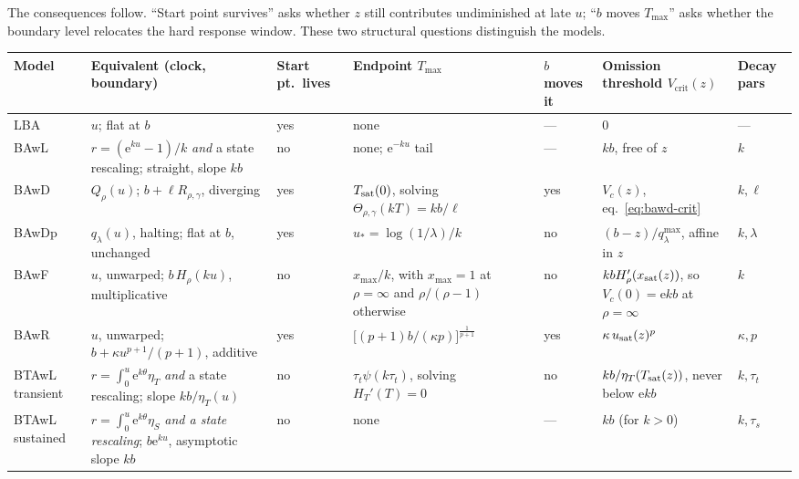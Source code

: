 \documentclass[12pt]{article}
\newcommand{\e}{\mathrm{e}}
\theoremstyle{remark}
\begin{document}
The consequences follow. ``Start point survives'' asks whether $z$ still contributes undiminished at late $u$; ``$b$ moves $T_{\max}$'' asks whether the boundary level relocates the hard response window. These two structural questions distinguish the models.

\begin{center}
\small
\begin{tabular}{L{0.07\textwidth}L{0.175\textwidth}L{0.05\textwidth}L{0.195\textwidth}L{0.05\textwidth}L{0.135\textwidth}L{0.05\textwidth}}
\toprule
Model & Equivalent (clock, boundary) & Start pt.\ lives & Endpoint
$T_{\max}$ & $b$ moves it & Omission threshold
$V_{\mathrm{crit}}(z)$ & Decay pars \\
\midrule
LBA & $u$; flat at $b$ & yes & none & --- & $0$ & --- \\
\addlinespace
BAwL & $r=(\e^{ku}-1)/k$ \emph{and} a state rescaling; straight, slope $kb$ &
no & none; $\e^{-ku}$ tail & --- & $kb$, free of $z$ & $k$ \\
\addlinespace
BAwD & $Q_\rho(u)$; $b+\ell R_{\rho,\gamma}$, diverging &
yes & $T_{\rm sat}(0)$, solving
$\Theta_{\rho,\gamma}(kT)=kb/\ell$ &
yes & $V_c(z)$, eq.~\eqref{eq:bawd-crit} & $k,\ell$ \\
\addlinespace
BAwDp & $q_\lambda(u)$, halting; flat at $b$, unchanged &
yes & $u_{*}=\log(1/\lambda)/k$ & no & $(b-z)/q_\lambda^{\max}$, affine in $z$
& $k,\lambda$ \\
\addlinespace
BAwF & $u$, unwarped; $b\,H_\rho(ku)$, multiplicative &
no & $x_{\max}/k$, with $x_{\max}=1$ at $\rho=\infty$ and
$\rho/(\rho-1)$ otherwise &
no & $kbH_\rho'(x_{\rm sat}(z))$, so $V_c(0)=\e kb$ at $\rho=\infty$ & $k$ \\
\addlinespace
BAwR & $u$, unwarped; $b+\kappa u^{p+1}/(p+1)$, additive &
yes & $\bigl[(p+1)b/(\kappa p)\bigr]^{\frac{1}{p+1}}$ & yes &
$\kappa\,u_{\rm sat}(z)^{p}$ & $\kappa,p$ \\
\addlinespace
BTAwL transient & $r=\int_0^u\e^{k\theta}\eta_T$ \emph{and} a state rescaling;
slope $kb/\eta_T(u)$ &
no & $\tau_t\psi(k\tau_t)$, solving $H_T'(T)=0$ &
no & $kb/\eta_T(T_{\rm sat}(z))$, never below $\e kb$ & $k,\tau_t$ \\
BTAwL sustained & $r=\int_0^u\e^{k\theta}\eta_S$ \emph{and a state rescaling};
$b\e^{ku}$, asymptotic slope $kb$ &
no & none & --- & $kb$ (for $k>0$) & $k,\tau_s$ \\
\bottomrule
\end{tabular}
\end{center}
\end{document}
